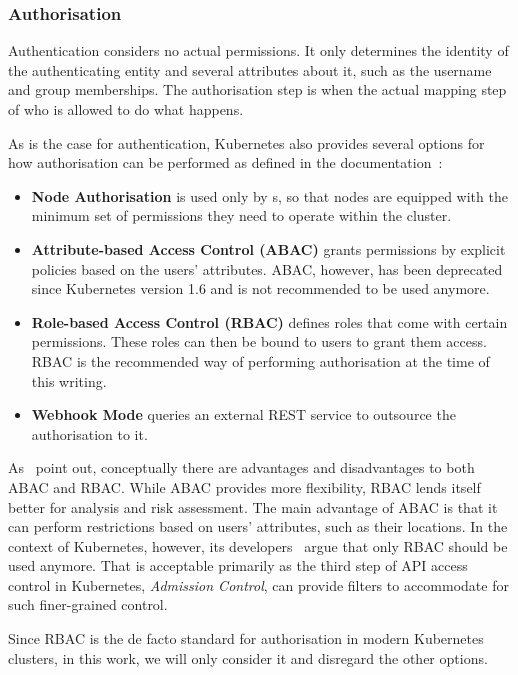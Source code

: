 \subsubsection{Authorisation} \label{authorisation}

Authentication considers no actual permissions. It only determines the identity of the authenticating entity and several attributes about it, such as the username and group memberships. The authorisation step is when the actual mapping step of who is allowed to do what happens. 

As is the case for authentication, Kubernetes also provides several options for how authorisation can be performed as defined in the documentation~\textcite{k8sdocs}:

\begin{itemize}
    \item \textbf{Node Authorisation} is used only by s, so that nodes are equipped with the minimum set of permissions they need to operate within the cluster.
    \item \textbf{Attribute-based Access Control (ABAC)} grants permissions by explicit policies based on the users' attributes. ABAC, however, has been deprecated since Kubernetes version 1.6 and is not recommended to be used anymore.
    \item \textbf{Role-based Access Control (RBAC)} defines roles that come with certain permissions. These roles can then be bound to users to grant them access. RBAC is the recommended way of performing authorisation at the time of this writing.
    \item \textbf{Webhook Mode} queries an external REST service to outsource the authorisation to it.
\end{itemize}

As~\textcite{ABACvsRBAC} point out, conceptually there are advantages and disadvantages to both ABAC and RBAC. While ABAC provides more flexibility, RBAC lends itself better for analysis and risk assessment. The main advantage of ABAC is that it can perform restrictions based on users' attributes, such as their locations. In the context of Kubernetes, however, its developers~\textcite{ABACvsRBACk8s} argue that only RBAC should be used anymore. That is acceptable primarily as the third step of API access control in Kubernetes, \textit{Admission Control}, can provide filters to accommodate for such finer-grained control.

Since RBAC is the de facto standard for authorisation in modern Kubernetes clusters, in this work, we will only consider it and disregard the other options.

